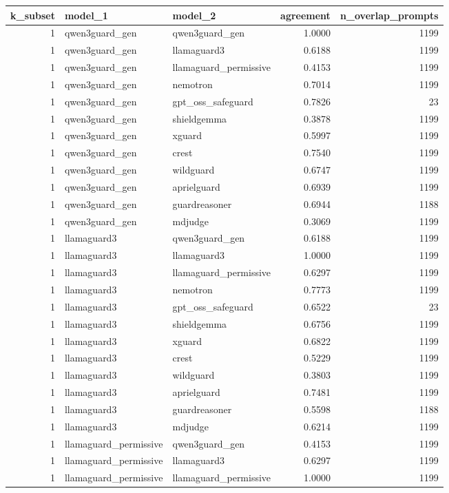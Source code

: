 \begin{tabular}{rllrr}
\toprule
k\_subset & model\_1 & model\_2 & agreement & n\_overlap\_prompts \\
\midrule
1 & qwen3guard\_gen & qwen3guard\_gen & 1.0000 & 1199 \\
1 & qwen3guard\_gen & llamaguard3 & 0.6188 & 1199 \\
1 & qwen3guard\_gen & llamaguard\_permissive & 0.4153 & 1199 \\
1 & qwen3guard\_gen & nemotron & 0.7014 & 1199 \\
1 & qwen3guard\_gen & gpt\_oss\_safeguard & 0.7826 & 23 \\
1 & qwen3guard\_gen & shieldgemma & 0.3878 & 1199 \\
1 & qwen3guard\_gen & xguard & 0.5997 & 1199 \\
1 & qwen3guard\_gen & crest & 0.7540 & 1199 \\
1 & qwen3guard\_gen & wildguard & 0.6747 & 1199 \\
1 & qwen3guard\_gen & aprielguard & 0.6939 & 1199 \\
1 & qwen3guard\_gen & guardreasoner & 0.6944 & 1188 \\
1 & qwen3guard\_gen & mdjudge & 0.3069 & 1199 \\
1 & llamaguard3 & qwen3guard\_gen & 0.6188 & 1199 \\
1 & llamaguard3 & llamaguard3 & 1.0000 & 1199 \\
1 & llamaguard3 & llamaguard\_permissive & 0.6297 & 1199 \\
1 & llamaguard3 & nemotron & 0.7773 & 1199 \\
1 & llamaguard3 & gpt\_oss\_safeguard & 0.6522 & 23 \\
1 & llamaguard3 & shieldgemma & 0.6756 & 1199 \\
1 & llamaguard3 & xguard & 0.6822 & 1199 \\
1 & llamaguard3 & crest & 0.5229 & 1199 \\
1 & llamaguard3 & wildguard & 0.3803 & 1199 \\
1 & llamaguard3 & aprielguard & 0.7481 & 1199 \\
1 & llamaguard3 & guardreasoner & 0.5598 & 1188 \\
1 & llamaguard3 & mdjudge & 0.6214 & 1199 \\
1 & llamaguard\_permissive & qwen3guard\_gen & 0.4153 & 1199 \\
1 & llamaguard\_permissive & llamaguard3 & 0.6297 & 1199 \\
1 & llamaguard\_permissive & llamaguard\_permissive & 1.0000 & 1199 \\

\end{tabular}

